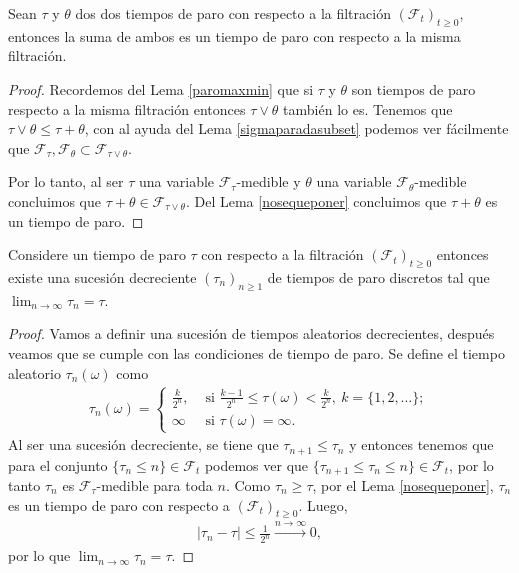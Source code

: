 \begin{lemma}
	Sean $\tau$ y $\theta$ dos dos tiempos de paro con respecto a la filtración $(\mathcal{F}_t)_{t \geq 0}$, entonces la suma de ambos es un tiempo de paro con respecto a la misma filtración.
\end{lemma}
\begin{proof}
	Recordemos del Lema \ref{paromaxmin} que si $\tau$ y $\theta$ son tiempos de paro respecto a la misma filtración entonces $\tau \vee \theta$ también lo es. Tenemos que $\tau \vee \theta \leq \tau + \theta$, con al ayuda del Lema \ref{sigmaparadasubset} podemos ver fácilmente que $\mathcal{F}_{\tau}, \mathcal{F}_{\theta} \subset \mathcal{F}_{\tau \vee \theta}$. 

	Por lo tanto, al ser $\tau$ una variable $\mathcal{F}_{\tau}$-medible y $\theta$ una variable $\mathcal{F}_{\theta}$-medible concluimos que $\tau + \theta \in \mathcal{F}_{\tau \vee \theta}$. Del Lema \ref{nosequeponer} concluimos que $\tau + \theta$ es un tiempo de paro.
\end{proof}

\begin{lemma}
	Considere un tiempo de paro $\tau$ con respecto a la filtración $(\mathcal{F}_t)_{t \geq 0}$ entonces existe una sucesión decreciente $(\tau_n)_{n \geq 1}$ de tiempos de paro discretos tal que $\lim_{n \rightarrow \infty} \tau_n = \tau$.
\end{lemma}
\begin{proof}
	Vamos a definir una sucesión de tiempos aleatorios decrecientes, después veamos que se cumple con las condiciones de tiempo de paro. Se define el tiempo aleatorio $\tau_n (\omega)$ como
	\begin{align*}
		\tau_n (\omega) =
		\begin{cases}
			\frac{k}{2^n}, & \text{ si } \frac{k-1}{2^n} \leq \tau(\omega) < \frac{k}{2^n}, \ k = \{1, 2, \ldots\}; \\
			\infty & \text{ si } \tau(\omega) = \infty.
		\end{cases}
	\end{align*}
    Al ser una sucesión decreciente, se tiene que $\tau_{n+1} \leq \tau_n$ y entonces tenemos que para el conjunto $\{ \tau_n \leq n \} \in \mathcal{F}_t$ podemos ver que $\{ \tau_{n+1} \leq \tau_n \leq n \} \in \mathcal{F}_t$, por lo tanto $\tau_n$ es $\mathcal{F}_{\tau}$-medible para toda $n$. Como $\tau_n \geq \tau$, por el Lema \ref{nosequeponer}, $\tau_n$ es un tiempo de paro con respecto a $(\mathcal{F}_t)_{t \geq 0}$. Luego, 
    \begin{align*}
		|\tau_n - \tau| \leq \frac{1}{2^n} \xrightarrow{n \rightarrow \infty} 0,
	\end{align*}
    por lo que $\lim_{n \rightarrow \infty} \tau_n = \tau$.
\end{proof}

